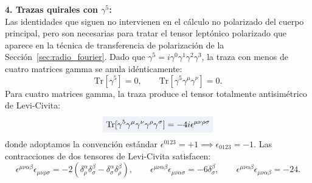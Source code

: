 \documentclass[10pt,a4paper]{article}
\newcommand{\dest}[1]{{\setlength{\fboxsep}{4pt}\colorbox{colordest}{$\displaystyle #1$}}}
\begin{document}
\textbf{4. Trazas quirales con $\gamma^5$:}\\
Las identidades que siguen no intervienen en el cálculo no polarizado del cuerpo principal, pero son necesarias para tratar el tensor leptónico polarizado que aparece en la técnica de transferencia de polarización de la Sección~\ref{sec:radio_fourier}. Dado que $\gamma^5 = i \gamma^0 \gamma^1 \gamma^2 \gamma^3$, la traza con menos de cuatro matrices gamma se anula idénticamente:
\begin{equation}
\text{Tr}[\gamma^5] = 0, \qquad \text{Tr}[\gamma^5 \gamma^\mu \gamma^\nu] = 0.
\end{equation}
Para cuatro matrices gamma, la traza produce el tensor totalmente antisimétrico de Levi-Civita:
\begin{equation}
\dest{\text{Tr}[\gamma^5 \gamma^\mu \gamma^\nu \gamma^\rho \gamma^\sigma] = -4i \epsilon^{\mu\nu\rho\sigma}}
\end{equation}
donde adoptamos la convención estándar $\epsilon^{0123} = +1 \implies \epsilon_{0123} = -1$. Las contracciones de dos tensores de Levi-Civita satisfacen:
\begin{equation}
\epsilon^{\mu\nu\alpha\beta} \epsilon_{\mu\nu\rho\sigma} = -2 (\delta_\rho^\alpha \delta_\sigma^\beta - \delta_\sigma^\alpha \delta_\rho^\beta), \qquad \epsilon^{\mu\nu\alpha\beta} \epsilon_{\mu\nu\alpha\sigma} = -6 \delta_\sigma^\beta, \qquad \epsilon^{\mu\nu\alpha\beta} \epsilon_{\mu\nu\alpha\beta} = -24.
\end{equation}



\end{document}
